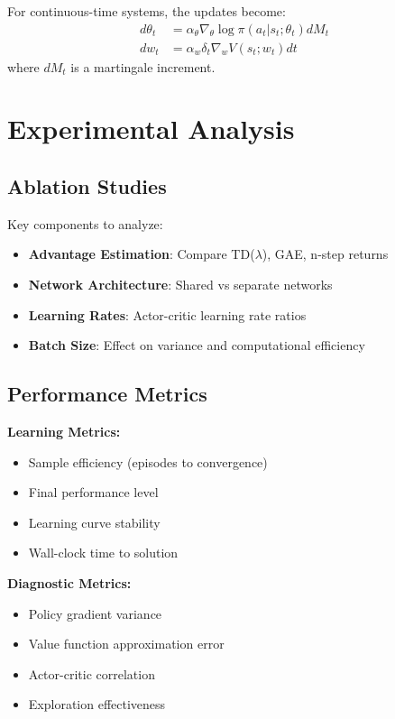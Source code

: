 For continuous-time systems, the updates become:
\begin{align}
d\theta_t &= \alpha_\theta \nabla_\theta \log \pi(a_t|s_t; \theta_t) dM_t \\
dw_t &= \alpha_w \delta_t \nabla_w V(s_t; w_t) dt
\end{align}
where $dM_t$ is a martingale increment.

\section{Experimental Analysis}

\subsection{Ablation Studies}

Key components to analyze:
\begin{itemize}
    \item \textbf{Advantage Estimation}: Compare TD($\lambda$), GAE, n-step returns
    \item \textbf{Network Architecture}: Shared vs separate networks
    \item \textbf{Learning Rates}: Actor-critic learning rate ratios
    \item \textbf{Batch Size}: Effect on variance and computational efficiency
\end{itemize}

\subsection{Performance Metrics}

\textbf{Learning Metrics:}
\begin{itemize}
    \item Sample efficiency (episodes to convergence)
    \item Final performance level
    \item Learning curve stability
    \item Wall-clock time to solution
\end{itemize}

\textbf{Diagnostic Metrics:}
\begin{itemize}
    \item Policy gradient variance
    \item Value function approximation error
    \item Actor-critic correlation
    \item Exploration effectiveness
\end{itemize}

